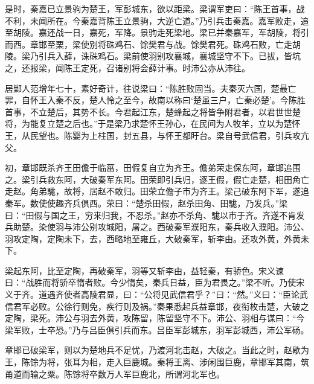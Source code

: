 \documentclass[12pt,UTF8]{ctexbook}
\begin{document}
是时，秦嘉已立景驹为楚王，军彭城东，欲以距梁。梁谓军吏曰：“陈王首事，战不利，未闻所在。今秦嘉背陈王立景驹，大逆亡道。”乃引兵击秦嘉。嘉军败走，追至胡陵。嘉还战一日，嘉死，军降。景驹走死梁地。梁已并秦嘉军，军胡陵，将引而西。章邯至栗，梁使别将硃鸡石、馀樊君与战。馀樊君死。硃鸡石败，亡走胡陵。梁乃引兵入薛，诛硃鸡石。梁前使羽别攻襄城，襄城坚守不下。已拔，皆坑之，还报梁，闻陈王定死，召诸别将会薛计事。时沛公亦从沛往。



居鄛人范增年七十，素好奇计，往说梁曰：“陈胜败固当。夫秦灭六国，楚最亡罪，自怀王入秦不反，楚人怜之至今，故南以称曰‘楚虽三户，亡秦必楚’。今陈胜首事，不立楚后，其势不长。今君起江东，楚蜂起之将皆争附君者，以君世世楚将，为能复立楚之后也。”于是梁乃求楚怀王孙心，在民间为人牧羊，立以为楚怀王，从民望也。陈婴为上柱国，封五县，与怀王都盱台。梁自号武信君，引兵攻亢父。



初，章邯既杀齐王田儋于临菑，田假复自立为齐王。儋弟荣走保东阿，章邯追围之。梁引兵救东阿，大破秦军东阿。田荣即引兵归，逐王假，假亡走楚，相田角亡走赵。角弟駹，故将，居赵不敢归。田荣立儋子市为齐王。梁己破东阿下军，遂追秦军。数使使趣齐兵俱西。荣曰：“楚杀田假，赵杀田角、田駹，乃发兵。”梁曰：“田假与国之王，穷来归我，不忍杀。”赵亦不杀角、駹以市于齐。齐遂不肯发兵助楚。染使羽与沛公别攻城阳，屠之。西破秦军濮阳东，秦兵收入濮阳。沛公、羽攻定陶，定陶未下，去，西略地至雍丘，大破秦军，斩李由。还攻外黄，外黄未下。



梁起东阿，比至定陶，再破秦军，羽等又斩李由，益轻秦，有骄色。宋义谏曰：“战胜而将骄卒惰者败。今少惰矣，秦兵日益，臣为君畏之。”梁不听。乃使宋义于齐。道遇齐使者高陵君显，曰：“公将见武信君乎？”曰：“然。”义曰：“臣论武信君军必败。公徐行则免，疾行则及祸。”秦果悉起兵益章邯，夜衔枚击楚，大破之定陶，梁死。沛公与羽去外黄，攻陈留，陈留坚守不下。沛公、羽相与谋曰：“今梁军败，士卒恐。”乃与吕臣俱引兵而东。吕臣军彭城东，羽军彭城西，沛公军砀。



章邯已破梁军，则以为楚地兵不足忧，乃渡河北击赵，大破之。当此之时，赵歇为王，陈馀为将，张耳为相，走入巨鹿城。秦将王离、涉闲围巨鹿，章邯军其南，筑甬道而输之粟。陈馀将卒数万人军巨鹿北，所谓河北军也。
\end{document}
